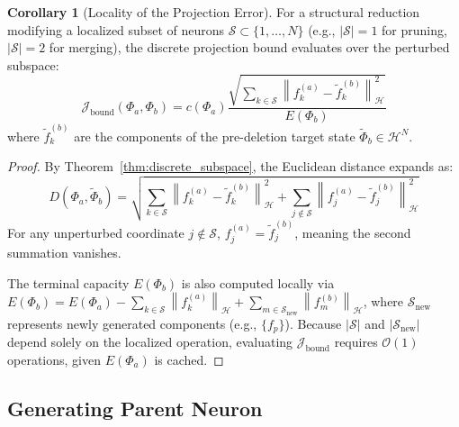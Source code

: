 \documentclass[11pt, a4paper, copyright, gdm]{google}
\newcommand{\norm}[1]{\left\lVert#1\right\rVert}
\newcommand{\calH}{\mathcal{H}}
\newcommand{\calJ}{\mathcal{J}}
\newcommand{\calO}{\mathcal{O}}
\newcommand{\calS}{\mathcal{S}}
\theoremstyle{definition}
\newtheorem{corollary}[theorem]{Corollary}
\begin{document}
\begin{corollary}[Locality of the Projection Error]
\label{cor:locality}
For a structural reduction modifying a localized subset of neurons $\calS \subset \{1, \dots, N\}$ (e.g., $|\calS|=1$ for pruning, $|\calS|=2$ for merging), the discrete projection bound evaluates over the perturbed subspace:
\begin{equation}
    \calJ_{\text{bound}}(\Phi_a, \Phi_b) = c(\Phi_a) \frac{\sqrt{\sum_{k \in \calS} \norm{f_k^{(a)} - \tilde{f}_k^{(b)}}_{\calH}^2}}{E(\Phi_b)}
\end{equation}
where $\tilde{f}_k^{(b)}$ are the components of the pre-deletion target state $\tilde{\Phi}_b \in \calH^N$.
\end{corollary}

\begin{proof}
By Theorem~\ref{thm:discrete_subspace}, the Euclidean distance expands as:
\begin{equation*}
    D(\Phi_a, \tilde{\Phi}_b) = \sqrt{\sum_{k \in \calS} \norm{f_k^{(a)} - \tilde{f}_k^{(b)}}_{\calH}^2 + \sum_{j \notin \calS} \norm{f_j^{(a)} - \tilde{f}_j^{(b)}}_{\calH}^2}
\end{equation*}
For any unperturbed coordinate $j \notin \calS$, $f_j^{(a)} = \tilde{f}_j^{(b)}$, meaning the second summation vanishes. 

The terminal capacity $E(\Phi_b)$ is also computed locally via $E(\Phi_b) = E(\Phi_a) - \sum_{k \in \calS} \norm{f_k^{(a)}}_{\calH} + \sum_{m \in \calS_{\text{new}}} \norm{f_m^{(b)}}_{\calH}$, where $\calS_{\text{new}}$ represents newly generated components (e.g., $\{f_p\}$). Because $|\calS|$ and $|\calS_{\text{new}}|$ depend solely on the localized operation, evaluating $\calJ_{\text{bound}}$ requires $\calO(1)$ operations, given $E(\Phi_a)$ is cached.
\end{proof}

\subsection{Generating Parent Neuron}
\end{document}
